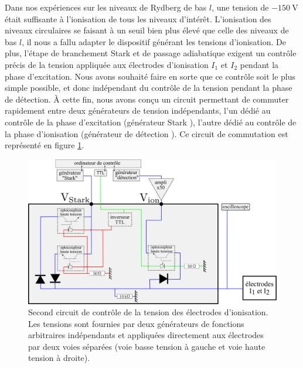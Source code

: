 \noindent Dans nos expériences sur les niveaux de Rydberg de bas $l$, une tension de $\SI{-150}{\V}$ était suffisante à l'ionisation de tous les niveaux d'intérêt.
L'ionisation des niveaux circulaires se faisant à un seuil bien plus élevé que celle des niveaux de bas $l$, il nous a fallu adapter le dispositif générant les tensions d'ionisation.
De plus, l'étape de branchement Stark et de passage adiabatique exigent un contrôle précis de la tension appliquée aux électrodes d'ionisation $I_1$ et $I_2$ pendant la phase d'excitation.
Nous avons souhaité faire en sorte que ce contrôle soit le plus simple possible, et donc indépendant du contrôle de la tension pendant la phase de détection.
\`A cette fin, nous avons conçu un circuit permettant de commuter rapidement entre deux générateurs de tension indépendants, l'un dédié au contrôle de la phase d'excitation (\og générateur Stark \fg{}), l'autre dédié au contrôle de la phase d'ionisation (\og générateur de détection \fg{}).
Ce circuit de commutation est représenté en figure \ref{fig:detectionbox_CdF}.

%
\begin{figure}[h]
\centering
\includegraphics[width=\linewidth]{figures/setup/rydberg/detectionbox_CdF}
\caption[Second circuit de contrôle de la tension des électrodes d'ionisation]{
Second circuit de contrôle de la tension des électrodes d'ionisation.
Les tensions sont fournies par deux générateurs de fonctions arbitraires indépendants et appliquées directement aux électrodes par deux voies séparées (voie basse tension à gauche et voie haute tension à droite).
}
\label{fig:detectionbox_CdF}
\end{figure}

